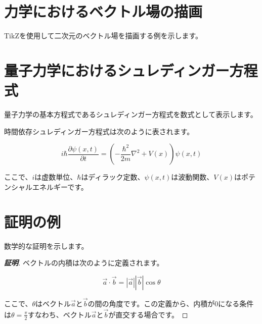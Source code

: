 \documentclass[
  11pt,
  a4paper]{ltjsarticle}
\let\origfigure\figure
\let\endorigfigure\endfigure
\renewenvironment{figure}[1][2] {
    \expandafter\origfigure\expandafter[H]
} {
    \endorigfigure
}
\begin{document}
\section{力学におけるベクトル場の描画}\label{ux529bux5b66ux306bux304aux3051ux308bux30d9ux30afux30c8ux30ebux5834ux306eux63cfux753b}

TikZを使用して二次元のベクトル場を描画する例を示します。

\begin{figure}
\centering
{}
\end{figure}

\section{量子力学におけるシュレディンガー方程式}\label{ux91cfux5b50ux529bux5b66ux306bux304aux3051ux308bux30b7ux30e5ux30ecux30c7ux30a3ux30f3ux30acux30fcux65b9ux7a0bux5f0f}

量子力学の基本方程式であるシュレディンガー方程式を数式として表示します。

\begin{tcolorbox}

時間依存シュレディンガー方程式は次のように表されます。

\[
i\hbar \frac{\partial \psi(x,t)}{\partial t} = \left( -\frac{\hbar^2}{2m} \nabla^2 + V(x) \right) \psi(x,t)
\]

ここで、\(i\)は虚数単位、\(\hbar\)はディラック定数、\(\psi(x,t)\)は波動関数、\(V(x)\)はポテンシャルエネルギーです。

\end{tcolorbox}

\section{証明の例}\label{ux8a3cux660eux306eux4f8b}

数学的な証明を示します。

\begin{proof}[\textbf{証明}]

ベクトルの内積は次のように定義されます。

\[
\vec{a} \cdot \vec{b} = |\vec{a}| |\vec{b}| \cos\theta
\]

ここで、\(\theta\)はベクトル\(\vec{a}\)と\(\vec{b}\)の間の角度です。この定義から、内積が0になる条件は\(\theta = \frac{\pi}{2}\)すなわち、ベクトル\(\vec{a}\)と\(\vec{b}\)が直交する場合です。

\end{proof}
\end{document}
